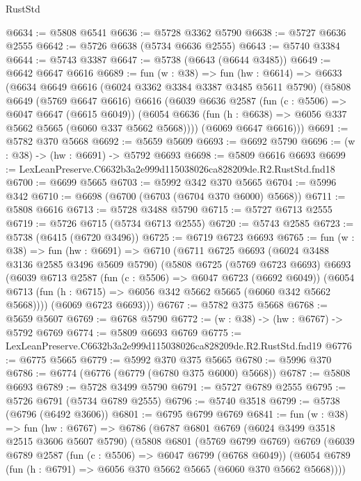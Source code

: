 \begin{lexlean}{RustStd}
\begin{coremodule}
@6634 := @5808 @6541
@6636 := @5728 @3362 @5790
@6638 := @5727 @6636 @2555
@6642 := @5726 @6638 (@5734 @6636 @2555)
@6643 := @5740 @3384
@6644 := @5743 @3387
@6647 := @5738 (@6643 (@6644 @3485))
@6649 := @6642 @6647 @6616
@6689 := fun (w : @38) =>
  fun (hw : @6614) =>
  @6633
    (@6634
      @6649
      @6616
      (@6024 @3362 @3384 @3387 @3485 @5611 @5790)
      (@5808
        @6649
        (@5769 @6647 @6616)
        @6616
        (@6039
          @6636
          @2587
          (fun (c : @5506) => @6047 @6647 (@6615 @6049))
          (@6054 @6636 (fun (h : @6638) => @6056 @337 @5662 @5665 (@6060 @337 @5662 @5668))))
        (@6069 @6647 @6616)))
@6691 := @5782 @370 @5668
@6692 := @5659 @5609
@6693 := @6692 @5790
@6696 := (w : @38) -> (hw : @6691) -> @5792 @6693
@6698 := @5809 @6616 @6693
@6699 := LexLeanPreserve.C6632b3a2e999d115038026ca828209de.R2.RustStd.fnd18
@6700 := @6699 @5665
@6703 := @5992 @342 @370 @5665
@6704 := @5996 @342
@6710 := @6698 (@6700 (@6703 (@6704 @370 @6000) @5668))
@6711 := @5808 @6616
@6713 := @5728 @3488 @5790
@6715 := @5727 @6713 @2555
@6719 := @5726 @6715 (@5734 @6713 @2555)
@6720 := @5743 @2585
@6723 := @5738 (@6415 (@6720 @3496))
@6725 := @6719 @6723 @6693
@6765 := fun (w : @38) =>
  fun (hw : @6691) =>
  @6710
    (@6711
      @6725
      @6693
      (@6024 @3488 @3136 @2585 @3496 @5609 @5790)
      (@5808
        @6725
        (@5769 @6723 @6693)
        @6693
        (@6039
          @6713
          @2587
          (fun (c : @5506) => @6047 @6723 (@6692 @6049))
          (@6054 @6713 (fun (h : @6715) => @6056 @342 @5662 @5665 (@6060 @342 @5662 @5668))))
        (@6069 @6723 @6693)))
@6767 := @5782 @375 @5668
@6768 := @5659 @5607
@6769 := @6768 @5790
@6772 := (w : @38) -> (hw : @6767) -> @5792 @6769
@6774 := @5809 @6693 @6769
@6775 := LexLeanPreserve.C6632b3a2e999d115038026ca828209de.R2.RustStd.fnd19
@6776 := @6775 @5665
@6779 := @5992 @370 @375 @5665
@6780 := @5996 @370
@6786 := @6774 (@6776 (@6779 (@6780 @375 @6000) @5668))
@6787 := @5808 @6693
@6789 := @5728 @3499 @5790
@6791 := @5727 @6789 @2555
@6795 := @5726 @6791 (@5734 @6789 @2555)
@6796 := @5740 @3518
@6799 := @5738 (@6796 (@6492 @3606))
@6801 := @6795 @6799 @6769
@6841 := fun (w : @38) =>
  fun (hw : @6767) =>
  @6786
    (@6787
      @6801
      @6769
      (@6024 @3499 @3518 @2515 @3606 @5607 @5790)
      (@5808
        @6801
        (@5769 @6799 @6769)
        @6769
        (@6039
          @6789
          @2587
          (fun (c : @5506) => @6047 @6799 (@6768 @6049))
          (@6054 @6789 (fun (h : @6791) => @6056 @370 @5662 @5665 (@6060 @370 @5662 @5668))))

\end{coremodule}
\end{lexlean}
